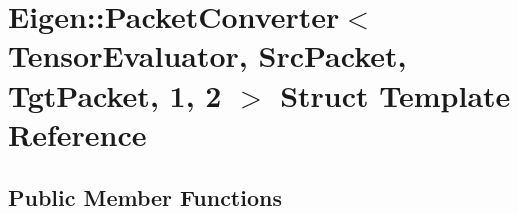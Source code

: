 \hypertarget{struct_eigen_1_1_packet_converter_3_01_tensor_evaluator_00_01_src_packet_00_01_tgt_packet_00_011_00_012_01_4}{}\section{Eigen\+:\+:Packet\+Converter$<$ Tensor\+Evaluator, Src\+Packet, Tgt\+Packet, 1, 2 $>$ Struct Template Reference}
\label{struct_eigen_1_1_packet_converter_3_01_tensor_evaluator_00_01_src_packet_00_01_tgt_packet_00_011_00_012_01_4}
\subsection*{Public Member Functions}
